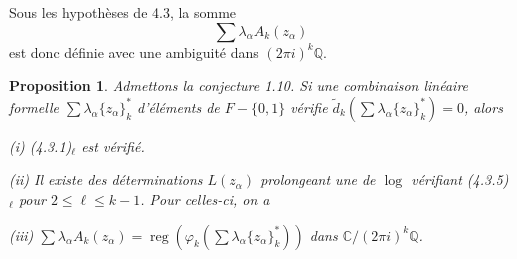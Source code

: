 \documentclass[12pt,a4paper]{article}
\theoremstyle{plain}
\newtheorem{proposition}{Proposition}[section]
\theoremstyle{definition}
\theoremstyle{remark}
\DeclareMathOperator{\reg}{reg}
\newcommand{\Q}{\mathbb{Q}}
\newcommand{\C}{\mathbb{C}}
\begin{document}
Sous les hypoth\`eses de 4.3, la somme
\begin{equation*}
\sum\lambda_\alpha A_k(z_\alpha)
\end{equation*}
est donc d\'efinie avec une ambiguit\'e dans $(2\pi i)^k\Q$.

\begin{proposition}
Admettons la conjecture 1.10. Si une combinaison lin\'eaire formelle $\sum\lambda_\alpha\{z_\alpha\}_k^*$ d'\'el\'ements de $F-\{0,1\}$ v\'erifie $\tilde{d}_k(\sum\lambda_\alpha\{z_\alpha\}_k^*)=0$, alors

\textup{(i)} (4.3.1)$_\ell$ est v\'erifi\'e.

\textup{(ii)} Il existe des d\'eterminations $L(z_\alpha)$ prolongeant une de $\log$ v\'erifiant (4.3.5)$_\ell$ pour $2\leq\ell\leq k-1$. Pour celles-ci, on a

\textup{(iii)} $\sum\lambda_\alpha A_k(z_\alpha)=\reg(\varphi_k(\sum\lambda_\alpha\{z_\alpha\}_k^*))$ dans $\C/(2\pi i)^k\Q$.
\end{proposition}
\end{document}
